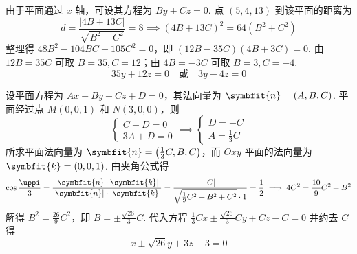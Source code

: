 \begin{solution}

    由于平面通过 $x$ 轴，可设其方程为 $By + Cz = 0$.
    点 $(5, 4, 13)$ 到该平面的距离为
    \begin{equation*}
        d = \frac{|4B + 13C|}{\sqrt{B^2 + C^2}} = 8 \implies (4B + 13C)^2 = 64(B^2 + C^2)
    \end{equation*}
    整理得 $48B^2 - 104BC - 105C^2 = 0$，即 $(12B - 35C)(4B + 3C) = 0$.
    由 $12B = 35C$ 可取 $B=35, C=12$；由 $4B = -3C$ 可取 $B=3, C=-4$.
    \begin{equation*}
        \boxed{35y + 12z = 0 \quad \text{或} \quad 3y - 4z = 0}
    \end{equation*}


    设平面方程为 $Ax + By + Cz + D = 0$，其法向量为 $\symbfit{n} = (A, B, C)$.
    平面经过点 $M(0, 0, 1)$ 和 $N(3, 0, 0)$，则
    \begin{equation*}
        \begin{cases}
            C + D = 0 \\
            3A + D = 0
        \end{cases} \implies \begin{cases}
            D = -C \\
            A = \frac{1}{3}C
        \end{cases}
    \end{equation*}
    所求平面法向量为 $\symbfit{n} = \left(\frac{1}{3}C, B, C\right)$，而 $Oxy$ 平面的法向量为 $\symbfit{k} = (0, 0, 1)$.
    由夹角公式得
    \begin{equation*}
        \cos \frac{\uppi}{3} = \frac{|\symbfit{n} \cdot \symbfit{k}|}{|\symbfit{n}| \cdot |\symbfit{k}|} = \frac{|C|}{\sqrt{\frac{1}{9}C^2 + B^2 + C^2} \cdot 1} = \frac{1}{2} \implies 4C^2 = \frac{10}{9}C^2 + B^2
    \end{equation*}
    解得 $B^2 = \frac{26}{9}C^2$，即 $B = \pm \frac{\sqrt{26}}{3}C$.
    代入方程 $\frac{1}{3}Cx \pm \frac{\sqrt{26}}{3}Cy + Cz - C = 0$ 并约去 $C$ 得
    \begin{equation*}
        \boxed{x \pm \sqrt{26}y + 3z - 3 = 0}
    \end{equation*}
\end{solution}

